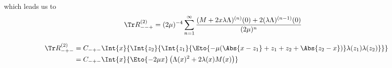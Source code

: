 which leads us to
\begin{align*}
  \Tr R_{--+}^{(2)}
  &= (2\mu)^{-4} \sum_{n=1}^{\infty}
  \frac{
    (M + 2x\lambda\Lambda)^{(n)}(0)
    + 2(\lambda\Lambda)^{(n-1)}(0)
  }{(2\mu)^n}
\end{align*}

\begin{align*}
  \Tr R_{-+-}^{(2)} &= C_{-+-} \Int{x}{
    \Int{z_2}{
      \Int{z_1}{
        \Eto{-\mu(\Abs{x-z_1}+z_1+z_2+\Abs{z_2-x})}\lambda(z_1)\lambda(z_2)
      }
    }
  } \\
  &= C_{-+-} \Int{x}{
    \Eto{-2\mu x}
    \left(
      \Lambda(x)^2 + 2\lambda(x)M(x)
    \right)
  }
\end{align*}
